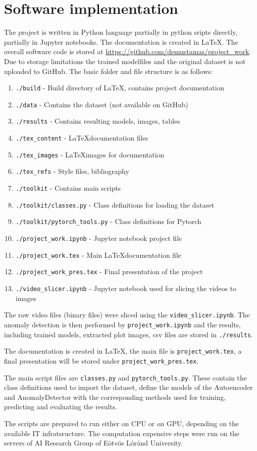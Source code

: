\section{Software implementation} \label{sw_code}
The project is written in Python language partially in python sripts directly,
partially in Jupyter notebooks.
The documentation is created in \LaTeX.
The overall software code is stored at \url{https://github.com/demustamas/project_work}.
Due to storage limitations the trained modelfiles and the original dataset is not uploaded to GitHub.
The basic folder and file structure is as follows:

\begin{enumerate}
    \item \lstinline{./build} - Build directory of \LaTeX, contains project documentation
    \item \lstinline{./data} - Contains the dataset (not available on GitHub)
    \item \lstinline{./results} - Contains resulting models, images, tables
    \item \lstinline{./tex_content} - \LaTeX documentation files
    \item \lstinline{./tex_images} - \LaTeX images for documentation
    \item \lstinline{./tex_refs} - Style files, bibliography
    \item \lstinline{./toolkit} - Contains main scripts
    \item \lstinline{./toolkit/classes.py} - Class definitions for loading the dataset
    \item \lstinline{./toolkit/pytorch_tools.py} - Class definitions for Pytorch
    \item \lstinline{./project_work.ipynb} - Jupyter notebook project file
    \item \lstinline{./project_work.tex} - Main \LaTeX documentation file
    \item \lstinline{./project_work_pres.tex} - Final presentation of the project
    \item \lstinline{./video_slicer.ipynb} - Jupyter notebook used for slicing the videos to images
\end{enumerate}

The raw video files (binary files) were sliced using the \lstinline{video_slicer.ipynb}.
The anomaly detection is then performed by \lstinline{project_work.ipynb} and the results,
including trained models, extracted plot images, csv files are stored in \lstinline{./results}.

The documentation is created in \LaTeX, the main file is \lstinline{project_work.tex},
a final presentation will be stored under \lstinline{project_work_pres.tex}.

The main script files are \lstinline{classes.py} and \lstinline{pytorch_tools.py}.
These contain the class definitions used to import the dataset, define the models
of the Autoencoder and AnomalyDetector with the corresponding methods used for training,
predicting and evaluating the results.

The scripts are prepared to run either on CPU or on GPU, depending on the available IT infratsructure.
The computation expensive steps were run on the servers of AI Research Group of Eötvös Lóránd University.